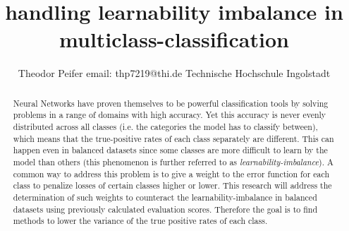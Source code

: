 \documentclass[journal]{IEEEtran}
\begin{document}
 
\title{\textbf{handling learnability imbalance in multiclass-classification}}



\author{Theodor Peifer
        \linebreak
        email: thp7219@thi.de
        \linebreak
        Technische Hochschule Ingolstadt
}



\maketitle


\begin{abstract}
Neural Networks have proven themselves to be powerful classification
tools by solving problems in a range of domains with high accuracy.
Yet this accuracy is never evenly distributed across all classes (i.e. the categories the model has to classify between), which means that the true-positive rates of each class separately are different.
This can happen even in balanced datasets since some classes are more difficult to learn by the model than others (this phenomenon is further referred to as \emph{learnability-imbalance}).
A common way to address this problem is to give a weight to the error function for each class to penalize losses of certain classes higher or lower.
This research will address the determination of such weights to counteract the learnability-imbalance in balanced datasets using previously calculated evaluation scores.
Therefore the goal is to find methods to lower the variance of the true positive rates of each class.
\end{abstract}
\end{document}
